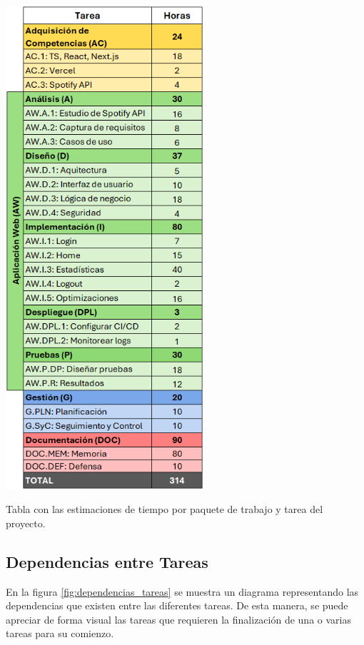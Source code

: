 \begin{table}[H]
    \centering
    \includegraphics[width=0.55\textwidth]{figures/estimaciones_tareas.png}
    \caption{Tabla con las estimaciones de tiempo por paquete de trabajo y tarea del proyecto.}
    \label{tab:estimaciones_tareas}
\end{table}

\subsection{Dependencias entre Tareas}

En la figura \ref{fig:dependencias_tareas} se muestra un diagrama representando las dependencias que existen entre las diferentes tareas. De esta manera, se puede apreciar de forma visual las tareas que requieren la finalización de una o varias tareas para su comienzo.


